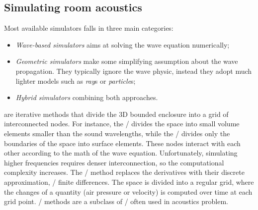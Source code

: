 \subsection{Simulating room acoustics}\label{sec:acoustics:simulators}
Most available simulators falls in three main categories:
\begin{itemize}
    \item \textit{Wave-based simulators} aims at solving the wave equation numerically;
    \item \textit{Geometric simulators} make some simplifying assumption about the wave propagation.
    They typically ignore the wave physic, instead they adopt much lighter models such as \textit{ray}s or \textit{particle}s;
    \item \textit{Hybrid simulators} combining both approaches.
\end{itemize}

 are iterative methods that divide the 3D bounded enclosure into a grid of interconnected nodes.
For instance, the \FEM/ divides the space into small volume elements smaller than the sound wavelengths,
while the \BEM/ divides only the boundaries of the space into surface elements.
These nodes interact with each other according to the math of the wave equation.
Unfortunately, simulating higher frequencies requires denser interconnection, so the computational complexity increases.
The \FDTDf/ method replaces the derivatives with their discrete approximation, \ie/ finite differences.
The space is divided into a regular grid, where the changes of a quantity (air pressure or velocity) is computed over time at each grid point.
\DWMf/ methods are a subclass of \FDTD/ often used in acoustics problem.

